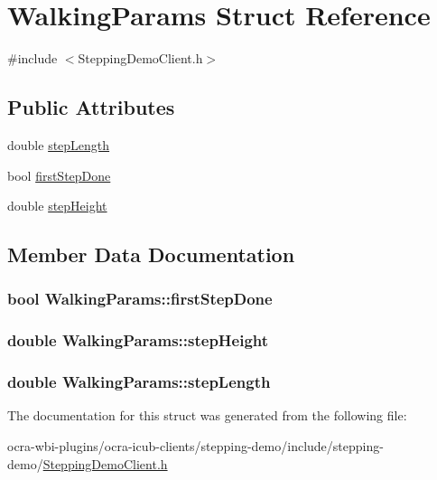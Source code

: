 \hypertarget{structWalkingParams}{\section{\-Walking\-Params \-Struct \-Reference}
\label{structWalkingParams}
}


{\ttfamily \#include $<$\-Stepping\-Demo\-Client.\-h$>$}

\subsection*{\-Public \-Attributes}
\begin{DoxyCompactItemize}
\item 
double \hyperlink{structWalkingParams_ad719bbe7ba3ed5ad027d0c42522693d7}{step\-Length}
\item 
bool \hyperlink{structWalkingParams_ae7de2cc6083d12bbfb2f66772f808b56}{first\-Step\-Done}
\item 
double \hyperlink{structWalkingParams_abfc5b4af75225435731b30bcd882a0ae}{step\-Height}
\end{DoxyCompactItemize}


\subsection{\-Member \-Data \-Documentation}
\hypertarget{structWalkingParams_ae7de2cc6083d12bbfb2f66772f808b56}{
\subsubsection[{first\-Step\-Done}]{\setlength{\rightskip}{0pt plus 5cm}bool {\bf \-Walking\-Params\-::first\-Step\-Done}}}\label{structWalkingParams_ae7de2cc6083d12bbfb2f66772f808b56}
\hypertarget{structWalkingParams_abfc5b4af75225435731b30bcd882a0ae}{
\subsubsection[{step\-Height}]{\setlength{\rightskip}{0pt plus 5cm}double {\bf \-Walking\-Params\-::step\-Height}}}\label{structWalkingParams_abfc5b4af75225435731b30bcd882a0ae}
\hypertarget{structWalkingParams_ad719bbe7ba3ed5ad027d0c42522693d7}{
\subsubsection[{step\-Length}]{\setlength{\rightskip}{0pt plus 5cm}double {\bf \-Walking\-Params\-::step\-Length}}}\label{structWalkingParams_ad719bbe7ba3ed5ad027d0c42522693d7}


\-The documentation for this struct was generated from the following file\-:\begin{DoxyCompactItemize}
\item 
ocra-\/wbi-\/plugins/ocra-\/icub-\/clients/stepping-\/demo/include/stepping-\/demo/\hyperlink{SteppingDemoClient_8h}{\-Stepping\-Demo\-Client.\-h}\end{DoxyCompactItemize}
